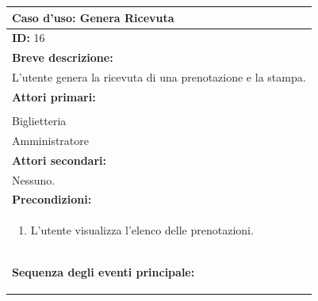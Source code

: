 \documentclass{article}
\begin{document}
                \begin{table}[H]
                    \begin{tabular}{|p{\linewidth}|}
                        \hline
                        \cellcolor{gray!100}
                        \color{white}
                        \centerline{\textbf{Caso d'uso:} Genera Ricevuta} \\
                        \hline
                        \textbf{ID:} 16 \\
                        \hline
                        \cellcolor{gray!20}
                        \textbf{Breve descrizione:} \\
                        \cellcolor{gray!20}
                        L'utente genera la ricevuta di una prenotazione e la stampa. \\
                        \hline
                        \textbf{Attori primari:} \\
                        \begin{minipage}{\linewidth}
                            Cliente \\
                            Biglietteria \\
                            Amministratore
                        \end{minipage}
                        \vspace{0pt} \\
                        \hline
                        \textbf{Attori secondari:} \\
                        Nessuno. \\
                        \hline
                        \cellcolor{gray!20}
                        \textbf{Precondizioni:} \\
                        \cellcolor{gray!20}
                        \begin{minipage}{\linewidth}
                            \begin{enumerate}
                                \item L'utente visualizza l'elenco delle prenotazioni.
                            \end{enumerate}
                        \end{minipage} \\
                        \hline
                        \textbf{Sequenza degli eventi principale:}
                        \begin{enumerate}

\end{enumerate}
\end{tabular}
\end{table}
\end{document}
